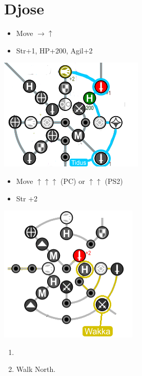 \chapter{Djose}

\begin{spheregrid}
	\begin{itemize}
		\tidusf
		\begin{itemize}
			\item Move $\rightarrow\uparrow$
			\item Str+1, HP+200, Agil+2
		\end{itemize}
		\includegraphics[width=.6\columnwidth]{graphics/Tidus_post_gui}
		\wakkaf
		\begin{itemize}
			\item Move $\uparrow\uparrow\uparrow$ (PC) or $\uparrow\uparrow$ (PS2)
			\item Str +2
		\end{itemize}
		\includegraphics[width=.6\columnwidth]{graphics/djosewakka}
	\end{itemize}
\end{spheregrid}
\begin{enumerate}
	\item \formation{\tidus}{\yuna}{\auron}
	\item Walk North.
\end{enumerate}

